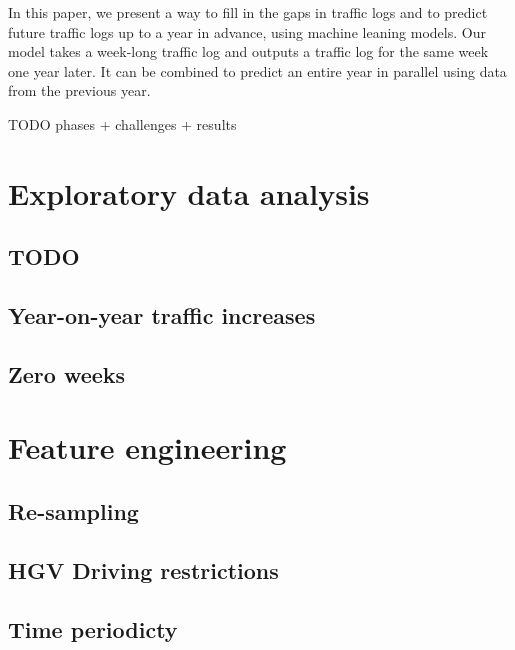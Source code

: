 \documentclass[10pt,conference,compsocconf]{IEEEtran}
\begin{document}
In this paper, we present a way to fill in the gaps in traffic logs and to predict future traffic 
logs up to a year in advance, using machine leaning models. Our model takes a week-long traffic
log and outputs a traffic log for the same week one year later. It can be combined to predict an 
entire year in parallel using data from the previous year. 

TODO phases + challenges + results



\section{Exploratory data analysis}

\subsection{TODO}

\subsection{Year-on-year traffic increases}

\subsection{Zero weeks}



\section{Feature engineering}

\subsection{Re-sampling}

\subsection{HGV Driving restrictions}

\subsection{Time periodicty}
\end{document}

